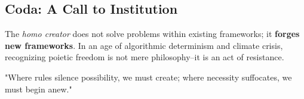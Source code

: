 \documentclass[11pt,a4paper]{article}
\begin{document}
\subsection{Coda: A Call to Institution}

The \emph{homo creator} does not solve problems within existing frameworks; it \textbf{forges new frameworks}. In an age of algorithmic determinism and climate crisis, recognizing poietic freedom is not mere philosophy--it is an act of resistance.

"Where rules silence possibility, we must create; where necessity suffocates, we must begin anew."

\printbibliography
\end{document}
